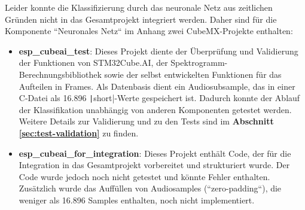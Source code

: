 Leider konnte die Klassifizierung durch das neuronale Netz aus zeitlichen Gründen nicht in das Gesamtprojekt integriert werden. Daher sind für die Komponente ``Neuronales Netz`` im Anhang zwei CubeMX-Projekte enthalten:

\begin{itemize}
\item \textbf{esp\_cubeai\_test}: Dieses Projekt diente der Überprüfung und Validierung der Funktionen von STM32Cube.AI, der Spektrogramm-Berechnungsbibliothek sowie der selbst entwickelten Funktionen für das Aufteilen in Frames. Als Datenbasis dient ein Audiosubsample, das in einer C-Datei als 16.896 \texttt|short|-Werte gespeichert ist. Dadurch konnte der Ablauf der Klassifikation unabhängig von anderen Komponenten getestet werden. Weitere Details zur Validierung und zu den Tests sind im \textbf{Abschnitt \ref{sec:test-validation}} zu finden.
\item \textbf{esp\_cubeai\_for\_integration}: Dieses Projekt enthält Code, der für die Integration in das Gesamtprojekt vorbereitet und strukturiert wurde. Der Code wurde jedoch noch nicht getestet und könnte Fehler enthalten. Zusätzlich wurde das Auffüllen von Audiosamples (``zero-padding``), die weniger als 16.896 Samples enthalten, noch nicht implementiert.
\end{itemize}
